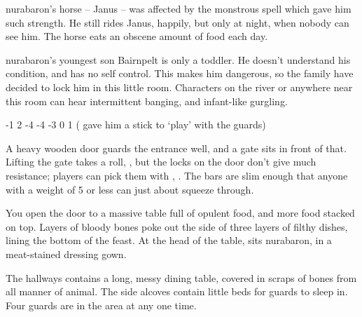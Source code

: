 \begin{multicols}{2}
\Gls{nurabaron}'s horse -- Janus -- was affected by the monstrous spell which gave him such strength.
He still rides Janus, happily, but only at night, when nobody can see him.
The horse eats an obscene amount of food each day.


\Gls{nurabaron}'s youngest son Bairnpelt is only a toddler.
He doesn't understand his condition, and has no self control.
This makes him dangerous, so the family have decided to lock him in this little room.
Characters on the river or anywhere near this room can hear intermittent banging, and infant-like gurgling.

{-1}%
{2}%
{{-4}%
{-4}%
{-3}}%
{0}%
{1}%
{}%
{\quarterstaff ( gave him a stick to `play' with the guards)}%
{}



A heavy wooden door guards the entrance well, and a gate sits in front of that.
Lifting the gate takes a  roll, \tn[10], but the locks on the door don't give much resistance; players can pick them with , \tn[8].
The bars are slim enough that anyone with a \gls{weight} of 5 or less can just about squeeze through.

\begin{boxtext}
  You open the door to a massive table full of opulent food, and more food stacked on top.
  Layers of bloody bones poke out the side of three layers of filthy dishes, lining the bottom of the feast.
  At the head of the table, sits \gls{nurabaron}, in a meat-stained dressing gown.
\end{boxtext}

The hallways contains a long, messy dining table, covered in scraps of bones from all manner of animal.
The side alcoves contain little beds for guards to sleep in.  Four guards are in the area at any one time.


\end{multicols}
